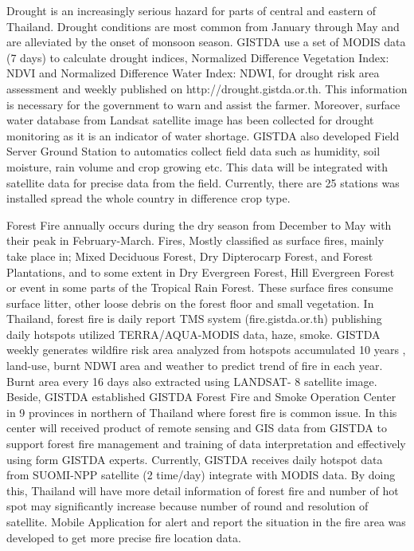 {{\vspace{0.4 cm}

Drought is an increasingly serious hazard for parts of central and eastern of Thailand. Drought conditions are most common from January through May and are alleviated by the onset of monsoon season. GISTDA use a set of MODIS data (7 days) to calculate drought indices, Normalized Difference Vegetation Index: NDVI and Normalized Difference Water Index: NDWI, for drought risk area assessment and weekly published on http://drought.gistda.or.th. This information is necessary for the government to warn and assist the farmer. Moreover, surface water database from Landsat satellite image has been collected for drought monitoring as it is an indicator of water shortage. GISTDA also developed Field Server Ground Station to automatics collect field data such as humidity, soil moisture, rain volume and crop growing etc. This data will be integrated with satellite data for precise data from the field. Currently, there are 25 stations was installed spread the whole country in difference crop type. 

\vspace{0.4 cm}

Forest Fire annually occurs during the dry season from December to May with their peak in February-March. Fires, Mostly classified as surface fires, mainly take place in; Mixed Deciduous Forest, Dry Dipterocarp Forest, and Forest Plantations, and to some extent in Dry Evergreen Forest, Hill Evergreen Forest or event in some parts of the Tropical Rain Forest. These surface fires consume surface litter, other loose debris on the forest floor and small vegetation. In Thailand, forest fire is daily report TMS system (fire.gistda.or.th) publishing daily hotspots utilized TERRA/AQUA-MODIS data, haze, smoke. GISTDA weekly generates wildfire risk area analyzed from hotspots accumulated 10 years , land-use, burnt NDWI area and weather to predict trend of fire in each year. Burnt area every 16 days also extracted using LANDSAT- 8 satellite image. Beside, GISTDA established GISTDA Forest Fire and Smoke Operation Center in 9 provinces in northern of Thailand where forest fire is common issue.   In this center will received product of remote sensing and GIS data from GISTDA to support forest fire management and training of data interpretation and effectively using form GISTDA experts. Currently, GISTDA receives daily hotspot data from SUOMI-NPP satellite (2 time/day) integrate with MODIS data. By doing this, Thailand will have more detail information of forest fire and number of hot spot may significantly increase because number of round and resolution of satellite. Mobile Application for alert and report the situation in the fire area was developed to get more precise fire location data. 

}}
